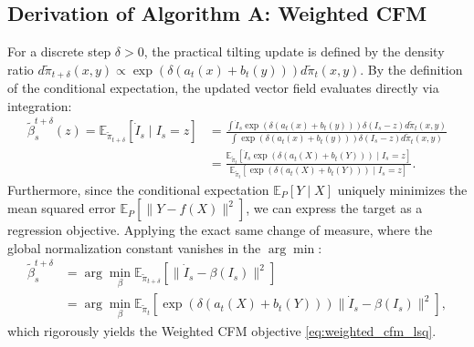 \documentclass[11pt]{article}
\theoremstyle{definition}
\numberwithin{equation}{section}%
\begin{document}
{\subsection{Derivation of Algorithm A: Weighted CFM} 
For a discrete step $\delta > 0$, the practical tilting update is defined by the density ratio $d\tilde{\pi}_{t+\delta}(x,y) \propto \exp(\delta(a_t(x)+b_t(y))) d\tilde{\pi}_t(x,y)$. By the definition of the conditional expectation, the updated vector field evaluates directly via integration:
\begin{align*}
    \tilde{\beta}_s^{t+\delta}(z) = \mathbb{E}_{\tilde{\pi}_{t+\delta}}[\dot{I}_s \mid I_s = z] 
    &= \frac{\int \dot{I}_s \exp(\delta(a_t(x)+b_t(y))) \delta(I_s - z) d\tilde{\pi}_t(x,y)}{\int \exp(\delta(a_t(x)+b_t(y))) \delta(I_s - z) d\tilde{\pi}_t(x,y)} \\
    &= \frac{\mathbb{E}_{\tilde{\pi}_t}\!\left[ \dot{I}_s \exp(\delta(a_t(X)+b_t(Y))) \mid I_s=z \right]}{\mathbb{E}_{\tilde{\pi}_t}\!\left[ \exp(\delta(a_t(X)+b_t(Y))) \mid I_s=z \right]}.
\end{align*}
Furthermore, since the conditional expectation $\mathbb{E}_{P}[Y \mid X]$ uniquely minimizes the mean squared error $\mathbb{E}_{P}[\|Y - f(X)\|^2]$, we can express the target as a regression objective. Applying the exact same change of measure, where the global normalization constant vanishes in the $\arg\min$:
\begin{align*}
    \tilde{\beta}_s^{t+\delta} 
    &= \arg\min_{\beta} \mathbb{E}_{\tilde{\pi}_{t+\delta}}\!\left[\|\dot{I}_s - \beta(I_s)\|^2\right] \\
    &= \arg\min_{\beta} \mathbb{E}_{\tilde{\pi}_t}\!\left[\exp(\delta(a_t(X)+b_t(Y))) \|\dot{I}_s - \beta(I_s)\|^2\right],
\end{align*}
which rigorously yields the Weighted CFM objective \eqref{eq:weighted_cfm_lsq}.

}
\end{document}
